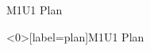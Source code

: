 \begin{frame}{M1U1 Plan}
	\tableofcontents
\end{frame}
%
%
\begin{frame}<0>[label=plan]{M1U1 Plan}
	\tableofcontents[currentsection]
\end{frame}